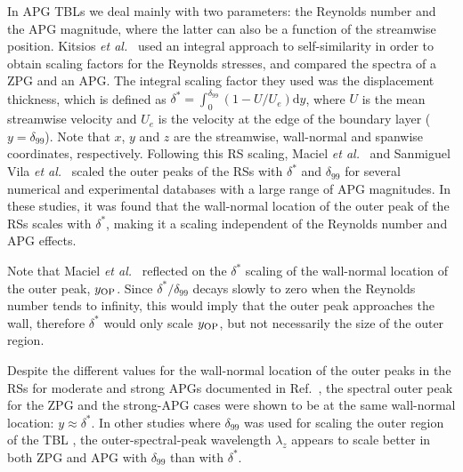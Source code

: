 In APG TBLs we deal mainly with two parameters: the Reynolds number and the APG magnitude, where the latter can also be a function of the streamwise position.
Kitsios {\it et al.}~\cite{Kitsios2016, Kitsios2017} used an integral approach to self-similarity in order to obtain scaling factors for the Reynolds stresses, and compared the spectra of a ZPG and an APG. 
The integral scaling factor they used was the displacement thickness, which is defined as $\delta^*=\int_0^{\delta_{99}} (1 - U/U_{e}) \mathrm{d}y $, where $U$ is the mean streamwise velocity and $U_e$ is the velocity at the edge of the boundary layer ($y=\delta_{99}$). Note that $x$, $y$ and $z$ are the streamwise, wall-normal and spanwise coordinates, respectively. 
Following this RS scaling, Maciel {\it et al.}~\cite{Maciel_2018} and Sanmiguel Vila {\it et al.}~\cite{Sanmiguel_PRF} scaled the outer peaks of the RSs with $\delta^*$ and $\delta_{99}$ for several numerical and experimental databases with a large range of APG magnitudes. 
In these studies, it was found that the wall-normal location of the outer peak of the RSs scales with $\delta^*$, making it a scaling independent of the Reynolds number and APG effects. 

Note that Maciel {\it et al.}~\cite{Maciel_2018} reflected on the $\delta^*$ scaling of the wall-normal location of the outer peak, $y_{\rm OP}$. Since $\delta^*/\delta_{99}$ decays slowly to zero when the Reynolds number tends to infinity, this would imply that the outer peak approaches the wall, therefore $\delta^*$ would only scale $y_{\rm OP}$, but not necessarily the size of the outer region.

Despite the different values for the wall-normal location of the outer peaks in the RSs for moderate and strong APGs documented in Ref.~\cite{Kitsios2017}, the spectral outer peak for the ZPG and the strong-APG cases were shown to be at the same wall-normal location: $y \approx \delta^*$. 
In other studies where $\delta_{99}$ was used for scaling the outer region of the TBL \cite{Lee2017, bobke2017}, the outer-spectral-peak wavelength $\lambda_z$ appears to scale better in both ZPG and APG with $\delta_{99}$ than with $\delta^*$. 

